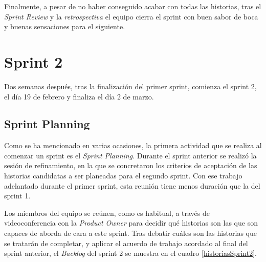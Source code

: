 Finalmente, a pesar de no haber conseguido acabar con todas las historias, tras el \emph{Sprint Review}  y la \emph{retrospectiva} el equipo cierra el sprint con buen sabor de boca y buenas sensaciones para el siguiente.
\clearpage
\section{Sprint 2}
\label{sec:sprint2}

Dos semanas después, tras la finalización del primer sprint, comienza el sprint 2, el día 19 de febrero y finaliza el día 2 de marzo.
 
\subsection{Sprint Planning}
\label{subsec:S2-SP}

Como se ha mencionado en varias ocasiones, la primera actividad que se realiza al comenzar un sprint es el \emph{Sprint Planning}. Durante el sprint anterior se realizó la sesión de refinamiento, en la que se concretaron los criterios de aceptación de las historias candidatas a ser planeadas para el segundo sprint. Con ese trabajo adelantado durante el primer sprint, esta reunión tiene menos duración que la del sprint 1.

Los miembros del equipo se reúnen, como es habitual, a través de videoconferencia con la \emph{Product Owner} para decidir qué historias son las que son capaces de aborda de cara a este sprint. Tras debatir cuáles son las historias que se tratarán de completar, y aplicar el acuerdo de trabajo acordado al final del sprint anterior, el \emph{Backlog} del sprint 2 se muestra en el cuadro \ref{historiasSprint2}.



